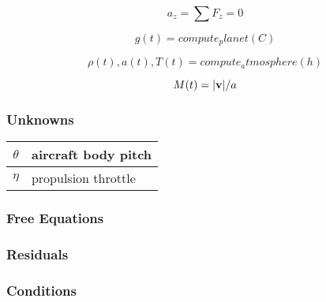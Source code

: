 \documentclass{article}
\begin{document}
\begin{equation}
    a_z = \sum F_z = 0
\end{equation}

\begin{equation}
    g(t) = compute_planet(C)    
\end{equation}

\begin{equation}
    \rho(t), a(t), T(t) = compute_atmosphere(h)
\end{equation}

\begin{equation}
    M(t) = |\mathbf{v}| / a
\end{equation}

\subsubsection*{Unknowns}

\begin{table}[htb]
\begin{center}
\begin{tabular}{|c|l|}
\hline
    $\theta$    & aircraft body pitch \\ \hline
	   $\eta$      & propulsion throttle \\ \hline
\end{tabular}
\end{center}
\end{table}

\subsubsection*{Free Equations}



\subsubsection*{Residuals}


\subsubsection*{Conditions}





%
\end{document}
